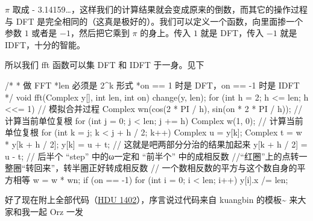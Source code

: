 $π$ 取成 - 3.14159…，这样我们的计算结果就会变成原来的倒数，而其它的操作过程与 DFT 是完全相同的（这真是极好的）。我们可以定义一个函数，向里面掺一个参数 $1$ 或者是 $-1$，然后把它乘到 $π$ 的身上。传入 $1$ 就是 DFT，传入 $-1$ 就是 IDFT，十分的智能。

所以我们 fft 函数可以集 DFT 和 IDFT 于一身。见下

\begin{cppcode}
/*
 * 做 FFT
 *len 必须是 2^k 形式
 *on == 1 时是 DFT，on == -1 时是 IDFT
 */
void fft(Complex y[], int len, int on) {
  change(y, len);
  for (int h = 2; h <= len; h <<= 1) {                  // 模拟合并过程
    Complex wn(cos(2 * PI / h), sin(on * 2 * PI / h));  // 计算当前单位复根
    for (int j = 0; j < len; j += h) {
      Complex w(1, 0);  // 计算当前单位复根
      for (int k = j; k < j + h / 2; k++) {
        Complex u = y[k];
        Complex t = w * y[k + h / 2];
        y[k] = u + t;  // 这就是吧两部分分治的结果加起来
        y[k + h / 2] = u - t;
        // 后半个 “step” 中的ω一定和 “前半个” 中的成相反数
        //“红圈”上的点转一整圈“转回来”，转半圈正好转成相反数
        // 一个数相反数的平方与这个数自身的平方相等
        w = w * wn;
      }
    }
  }
  if (on == -1) {
    for (int i = 0; i < len; i++) {
      y[i].x /= len;
    }
  }
}
\end{cppcode}

好了现在附上全部代码（\href{http://acm.hdu.edu.cn/showproblem.php?pid=1402}{HDU 1402}），序言说过代码来自 kuangbin 的模板\st{}\textasciitilde{} 来大家和我一起 Orz 一发

